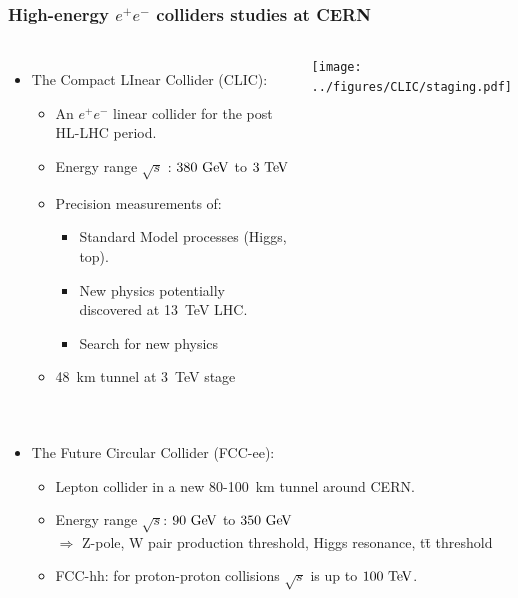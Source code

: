 \begin{frame}
  \frametitle{High-energy $e^+e^-$ colliders studies at CERN}

  \begin{columns}
    \begin{itemize}
    \item The Compact LInear Collider (CLIC):
      \begin{itemize}
      \item An $e^{+}e^{-}$ linear collider for the post HL-LHC period.
      \item Energy range $\sqrt{s}$ : \textcolor{Green}{$380\,\mathrm{\,Ge\kern -0.1em V}$} to
        \textcolor{Green}{$3\,\mathrm{\,Te\kern -0.1em V}$}
      \item Precision measurements of:
        \begin{itemize}
        \item Standard Model processes (Higgs, top).
        \item New physics potentially discovered at 13~TeV LHC.
        \item Search for new physics
        \end{itemize}
      \item 48~km tunnel at 3~TeV stage
      \end{itemize}
    \end{itemize}

    \centering
    \texttt{[image: ../figures/CLIC/staging.pdf]}
  \end{columns}
  
  \begin{columns}

    \begin{itemize}
    \item The Future Circular Collider (FCC-ee):
      \begin{itemize}
      \item Lepton collider in a new 80-100~km tunnel around CERN.
      \item Energy range $\sqrt{s}$: \textcolor{Green}{$90\,\mathrm{\,Ge\kern -0.1em V}$} to
        \textcolor{Green}{$350\,\mathrm{\,Ge\kern -0.1em V}$} \\
        $\Rightarrow$ Z-pole, W pair production threshold, Higgs
        resonance, t\={t} threshold
      \item FCC-hh: for proton-proton collisions $\sqrt{s}$ is up to $100\,\mathrm{\,Te\kern -0.1em V}$.
      \end{itemize}
    \end{itemize}


\end{columns}
\end{frame}
